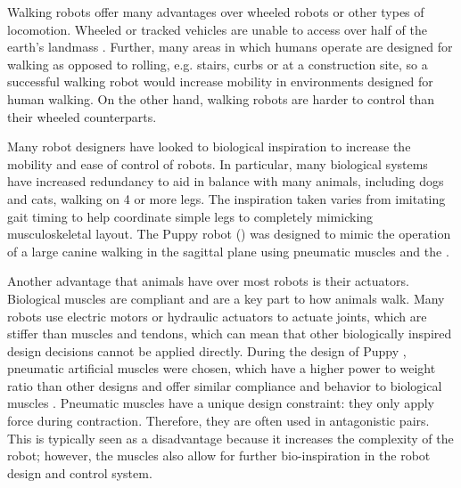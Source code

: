 Walking robots offer many advantages over wheeled robots or other types
of locomotion. Wheeled or tracked vehicles are unable to access over half
of the earth's landmass \cite{BigDog}. Further, many areas in which humans
operate are designed for walking as opposed to rolling, e.g. stairs, curbs or at a construction site, so a successful walking
robot would increase mobility in environments designed for human walking. On the
other hand, walking robots are harder to control than their wheeled
counterparts.

Many robot designers have looked to biological inspiration to increase the mobility and
ease of control of robots. In particular, many biological systems have increased
redundancy to aid in balance with many animals, including dogs and cats, walking
on 4 or more legs. The inspiration taken varies from imitating gait timing \cite{Raibert1986} to
help coordinate simple legs to completely mimicking musculoskeletal layout. The
Puppy robot () was designed to mimic the operation of a large 
canine walking in the sagittal plane using pneumatic muscles and the \cite{PuppyDesign}.

Another advantage that animals have over most robots is their actuators.
Biological muscles are compliant and are a key part to how animals walk. Many
robots use electric motors or hydraulic actuators to actuate joints, which are stiffer than muscles and tendons, which can
mean that other biologically inspired design decisions cannot be applied directly. During the design of Puppy \cite{PuppyDesign}, pneumatic artificial muscles were chosen, which have a higher
power to weight ratio than other designs and offer similar compliance and
behavior to biological muscles \cite{Tavakoli2008}. Pneumatic muscles have a unique design constraint: they only apply force during contraction. Therefore,
they are often used in antagonistic pairs. This is typically seen as a disadvantage because it increases the complexity of the robot; however, the muscles also allow for further bio-inspiration in the robot design
and control system.

